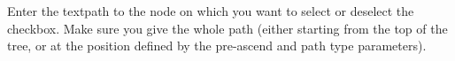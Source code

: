 
Enter the textpath to the node on which you want to select or deselect the checkbox. Make sure you give the whole path (either starting from the top of the tree, or at the position defined by the pre-ascend and path type parameters).



